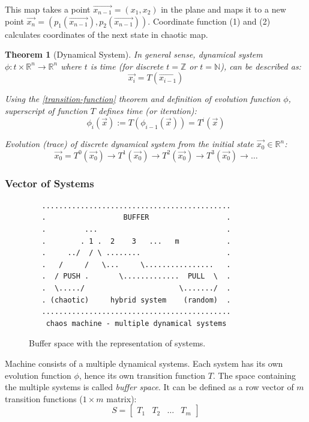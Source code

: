 \documentclass[twocolumn, a4paper, 10pt]{article}
\newtheorem{theorem}{Theorem}[section]
\begin{document}
This map takes a point $\vec{x_{n-1}} = (x_1, x_2)$ in the plane and maps it to a new point $\vec{x_n} = (p_1(\vec{x_{n-1}}), p_2(\vec{x_{n-1}}))$. Coordinate function (1) and (2) calculates coordinates of the next state in chaotic map.

\begin{theorem}
[Dynamical System]
\label{dynamical-system}\hfill\break
In general sense, dynamical system $\phi: t \times \mathbb{R}^n \to \mathbb{R}^n$ where $t$ is time (for discrete $t = \mathbb{Z}$ or $t = \mathbb{N}$), can be described as: $$\vec{x_i} = T(\vec{x_{i-1}})$$

Using the \ref{transition-function} theorem and definition of evolution function $\phi$, superscript of function $T$ defines time (or iteration): $$\phi_i(\vec{x}) := T(\phi_{i-1}(\vec{x})) = T^i(\vec{x})$$

Evolution (trace) of discrete dynamical system from the initial state $\vec{x_0} \in \mathbb{R}^n$: $$\vec{x_0} = T^0(\vec{x_0}) \to T^1(\vec{x_0}) \to T^2(\vec{x_0}) \to T^3(\vec{x_0}) \to \dots$$
\end{theorem}

\subsubsection{Vector of Systems}
\label{sssec:buffer-space}

\begin{figure}
\begin{verbatim}
   ............................................
   .                  BUFFER                  .
   .         ...                              .
   .        . 1 .  2    3   ...   m           .
   .     ../  / \ ........                    .
   .   /     /   \...     \................   .
   .  / PUSH .       \.............  PULL  \  .
   .  \...../                      \......./  .
   . (chaotic)     hybrid system    (random)  .
   ............................................
    chaos machine - multiple dynamical systems
\end{verbatim}
  \caption{Buffer space with the representation of systems.}
  \label{fig:buffer-space}
\end{figure}

Machine consists of a multiple dynamical systems. Each system has its own evolution function $\phi$, hence its own transition function $T$. The space containing the multiple systems is called \textit{buffer space}. It can be defined as a row vector of $m$ transition functions ($1 \times m$ matrix): $$S = \begin{bmatrix} T_1 & T_2 & \dots & T_m \end{bmatrix}$$
\end{document}
